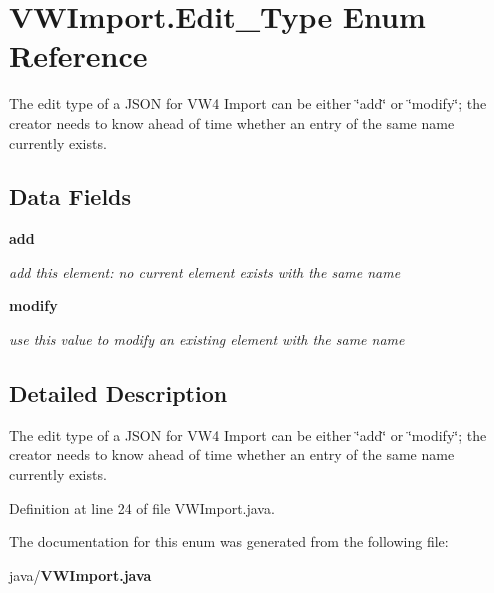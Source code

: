 \section{V\+W\+Import.\+Edit\+\_\+\+Type Enum Reference}
\label{enumorg_1_1smallfoot_1_1vw4_1_1VWImport_1_1Edit__Type}


The edit type of a J\+S\+O\+N for V\+W4 Import can be either \char`\"{}add\char`\"{} or \char`\"{}modify\char`\"{}; the creator needs to know ahead of time whether an entry of the same name currently exists.  


\subsection*{Data Fields}
\begin{DoxyCompactItemize}
\item 
{\bf add}\label{enumorg_1_1smallfoot_1_1vw4_1_1VWImport_1_1Edit__Type_a393e4cd5187ecf30d2db2129a73f3c05}

\begin{DoxyCompactList}\small\item\em add this element\+: no current element exists with the same name \end{DoxyCompactList}\item 
{\bf modify}\label{enumorg_1_1smallfoot_1_1vw4_1_1VWImport_1_1Edit__Type_afa21b51665d4dc82669bba18a62d8b58}

\begin{DoxyCompactList}\small\item\em use this value to modify an existing element with the same name \end{DoxyCompactList}\end{DoxyCompactItemize}


\subsection{Detailed Description}
The edit type of a J\+S\+O\+N for V\+W4 Import can be either \char`\"{}add\char`\"{} or \char`\"{}modify\char`\"{}; the creator needs to know ahead of time whether an entry of the same name currently exists. 

Definition at line 24 of file V\+W\+Import.\+java.



The documentation for this enum was generated from the following file\+:\begin{DoxyCompactItemize}
\item 
java/{\bf V\+W\+Import.\+java}\end{DoxyCompactItemize}
